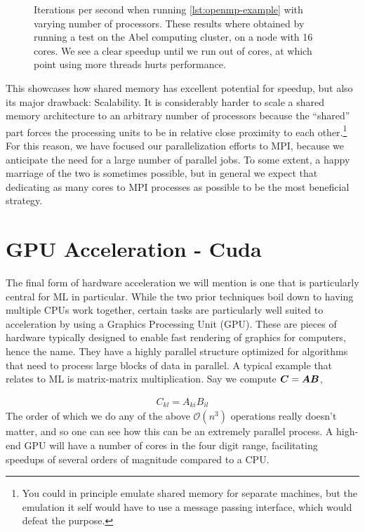 \documentclass[Thesis.tex]{subfiles}
\begin{document}
\begin{figure}[h]
  \centering
    \resizebox{0.7\linewidth}{!}{%
        
    }
  \caption{Iterations per second when running \cref{lst:openmp-example} with
    varying number of processors. These results where obtained by running a test
    on the Abel computing cluster, on a node with 16 cores. We see a clear
    speedup until we run out of cores, at which point using more threads hurts
    performance.}
  \label{fig:mpi-example}
\end{figure}

This showcases how shared memory has excellent potential for speedup, but also
its major drawback: Scalability. It is considerably harder to scale a shared
memory architecture to an arbitrary number of processors because the ``shared''
part forces the processing units to be in relative close proximity to each
other.\footnote{You could in principle emulate shared memory for separate
  machines, but the emulation it self would have to use a message passing
  interface, which would defeat the purpose.} For this reason, we have focused
our parallelization efforts to MPI, because we anticipate the need for a large
number of parallel jobs. To some extent, a happy marriage of the two is
sometimes possible, but in general we expect that dedicating as many cores to
MPI processes as possible to be the most beneficial strategy.


\section{GPU Acceleration - Cuda}

The final form of hardware acceleration we will mention is one that is
particularly central for ML in particular. While the two prior techniques boil
down to having multiple CPUs work together, certain tasks are particularly well
suited to acceleration by using a Graphics Processing Unit (GPU). These are
pieces of hardware typically designed to enable fast rendering of graphics for
computers, hence the name. They have a highly parallel structure optimized for
algorithms that need to process large blocks of data in parallel. A typical
example that relates to ML is matrix-matrix multiplication. Say we compute $\bm{C} = \bm{A} \bm{B}$,

\begin{align}
  C_{kl} = A_{ki}B_{il}
\end{align}
The order of which we do any of the above $\mathcal{O}(n^3)$ operations really
doesn't matter, and so one can see how this can be an extremely parallel
process. A high-end GPU will have a number of cores in the four digit range,
facilitating speedups of several orders of magnitude compared to a CPU.
\end{document}
